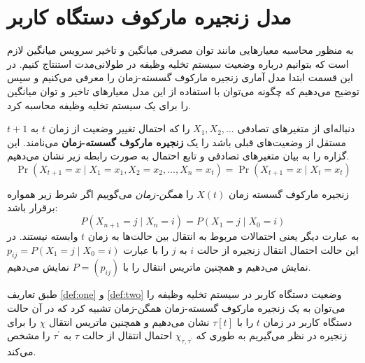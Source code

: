 \section{مدل زنجیره مارکوف دستگاه کاربر}
به منظور محاسبه معیارهایی مانند توان مصرفی میانگین و تاخیر سرویس میانگین لازم است که بتوانیم درباره وضعیت سیستم تخلیه وظیفه در طولانی‌مدت استنتاج کنیم. در این قسمت ابتدا مدل آماری زنجیره مارکوف گسسته-زمان را معرفی می‌کنیم و سپس توضیح می‌دهیم که چگونه می‌توان با استفاده از این مدل معیارهای تاخیر و توان میانگین را برای یک سیستم تخلیه وظیفه محاسبه کرد.
\begin{defi}
\label{def:one}
دنباله‌ای از متغیرهای تصادفی $X_{1}, X_{2}, \ldots$ را که احتمال تغییر وضعیت از زمان $t$ به $t + 1$ مستقل از وضعیت‌های قبلی باشد را یک \textbf{زنجیره مارکوف گسسته-زمان} می‌نامند. این گزاره را به بیان متغیرهای تصادفی و تابع احتمال به صورت رابطه زیر نشان می‌دهیم.
\begin{equation*}
	\operatorname{Pr}\left(X_{t+1}=x \mid X_{1}=x_{1}, X_{2}=x_{2}, \ldots, X_{n}=x_{t}\right)=\operatorname{Pr}\left(X_{t+1}=x \mid X_{t}=x_{t}\right)
\end{equation*}
\end{defi}
\begin{defi}
\label{def:two}
زنجیره مارکوف گسسته زمان $X(t)$ را \textit{همگن-زمان} می‌گوییم اگر شرط زیر همواره برقرار باشد:
\begin{equation*}
P\left(X_{n+1}=j \mid X_{n}=i\right)=P\left(X_{1}=j \mid X_{0}=i\right)
\end{equation*}
به عبارت دیگر یعنی احتمالات مربوط به انتقال بین حالت‌ها به زمان \(t\) وابسته نیستند. در این حالت احتمال انتقال زنجیره از حالت \(i\) به \(j\) را با عبارت $p_{i j}=P\left(X_{1}=j \mid X_{0}=i\right)$ نمایش می‌دهیم و همچنین ماتریس انتقال را با $P=\left(p_{i j}\right)$ نمایش می‌دهیم.
\end{defi}
طبق تعاریف \ref{def:one} و \ref{def:two} وضعیت دستگاه کاربر در سیستم تخلیه وظیفه را می‌توان به یک زنجیره مارکوف گسسته-زمان همگن-زمان تشبیه کرد که در آن حالت دستگاه کاربر در زمان $t$ را با $\tau[t]$ نشان می‌دهیم و همچنین ماتریس انتقال $\chi$ را برای زنجیره در نظر می‌گیریم به طوری که $\chi_{\tau, \tau^{\prime}}$ احتمال انتقال از حالت $\tau$ به \(\tau^{\prime}\) را مشخص می‌کند.

\clearpage
